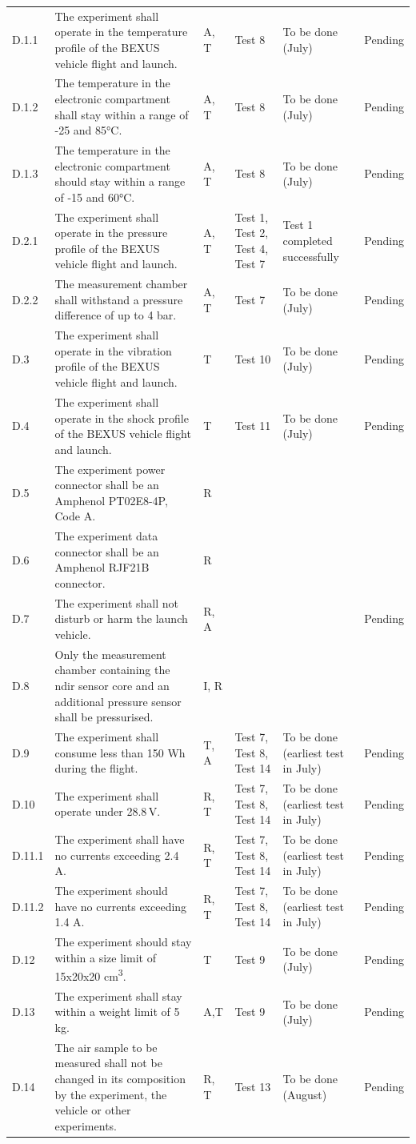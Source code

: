 \documentclass[
  a4paper,
  11pt,
  openany,
  parskip,
  toc=totoc,
  listof=totoc,
  bibliography=totoc
]{scrreprt}
\begin{document}
\begin{longtable}{L{0.7cm}L{5cm}L{1.5cm}L{2cm}L{2.5cm}L{2cm}}
D.1.1 & The experiment shall operate in the temperature profile of the BEXUS vehicle flight and launch. & A, T & Test 8 & To be done (July) & Pending \\
D.1.2 & The temperature in the electronic compartment shall stay within a range of -25 and 85°C. & A, T & Test 8 & To be done (July) & Pending\\
D.1.3 & The temperature in the electronic compartment should stay within a range of -15 and 60°C.& A, T & Test 8 & To be done (July) & Pending\\
D.2.1 & The experiment shall operate in the pressure profile of the BEXUS vehicle flight and launch. & A, T & Test 1, Test 2, Test 4, Test 7 & Test 1 completed successfully  & Pending \\
D.2.2 & The measurement chamber shall withstand a pressure difference of up to 4 bar.  & A, T & Test 7 & To be done (July) & Pending \\
D.3 & The experiment shall operate in the vibration profile of the BEXUS vehicle flight and launch. & T & Test 10 & To be done (July) & Pending \\
D.4 & The experiment shall operate in the shock profile of the BEXUS vehicle flight and launch. & T & Test 11 & To be done (July) & Pending \\
D.5 & The experiment power connector shall be an Amphenol PT02E8-4P, Code A. & R & & & \\
D.6 & The experiment data connector shall be an Amphenol RJF21B connector.  & R & & & \\
D.7 & The experiment shall not disturb or harm the launch vehicle.  & R, A &  &  & Pending \\
D.8 & Only the measurement chamber containing the \gls{ndir} sensor core and an additional pressure sensor shall be pressurised. & I, R & & & \\
D.9 & The experiment shall consume less than 150 Wh during the flight. & T, A & Test 7, Test 8, Test 14 & To be done (earliest test in July) & Pending \\
D.10 & The experiment shall operate under 28.8\,V.  & R, T & Test 7, Test 8, Test 14 & To be done (earliest test in July) & Pending \\
D.11.1 & The experiment shall have no currents exceeding 2.4 A. & R, T & Test 7, Test 8, Test 14 & To be done (earliest test in July) & Pending \\
D.11.2 & The experiment should have no currents exceeding 1.4 A.  & R, T & Test 7, Test 8, Test 14 & To be done (earliest test in July) & Pending \\
D.12 & The experiment should stay within a size limit of 15x20x20 cm\textsuperscript{3}. & T & Test 9 & To be done (July) & Pending  \\
D.13 & The experiment shall stay within a weight limit of 5 kg. & A,T & Test 9 & To be done (July) & Pending \\
D.14 & The air sample to be measured shall not be changed in its composition by the experiment, the vehicle or other experiments. & R, T & Test 13 & To be done (August) & Pending \\


\end{longtable}
\end{document}

